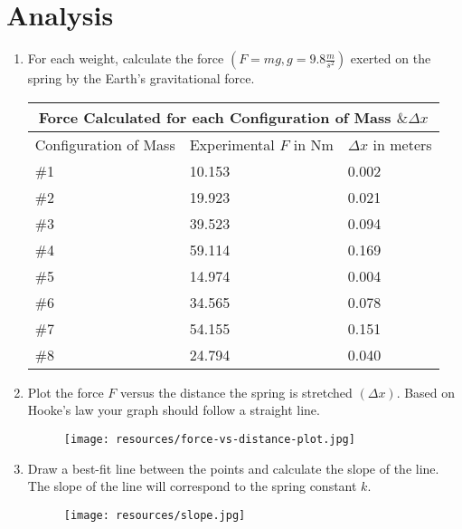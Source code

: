 \chapter{Analysis}

\begin{enumerate}
  \item For each weight, calculate the force $(F = mg, g = 9.8\frac{m}{s^2})$ exerted on
        the spring by the Earth's gravitational force.
	\begin{center}
  	\begin{tabular} { |p{2cm}|p{2cm}|p{2cm}| }
			\hline
  		\multicolumn{3}{|c|}{Force Calculated for each Configuration of Mass $\& \Delta x$} \\
			\hline 
			\centering Configuration of Mass & Experimental $F$ in Nm & $\Delta x$ in meters \\ 
			\hline
			\#1 & 10.153 & 0.002 \\
			\hline
			\#2 & 19.923 & 0.021 \\
			\hline
			\#3 & 39.523 & 0.094 \\
			\hline
			\#4 & 59.114 & 0.169 \\
			\hline
			\#5 & 14.974 & 0.004 \\
			\hline
			\#6 & 34.565 & 0.078 \\
			\hline
			\#7 & 54.155 & 0.151 \\
			\hline
			\#8 & 24.794 & 0.040 \\
			\hline
    \end{tabular}
	\end{center}

  \item Plot the force $F$ versus the distance the spring is stretched $(\Delta x)$.
        Based on Hooke's law your graph should follow a straight line.

				\begin{figure}[h!]
					\centerline{\texttt{[image: resources/force-vs-distance-plot.jpg]}}
				\end{figure}

  \item Draw a best-fit line between the points and calculate the slope of the line.
        The slope of the line will correspond to the spring constant $k$.

				\begin{figure}[h!]
					\centerline{\texttt{[image: resources/slope.jpg]}}
				\end{figure}


\end{enumerate}
